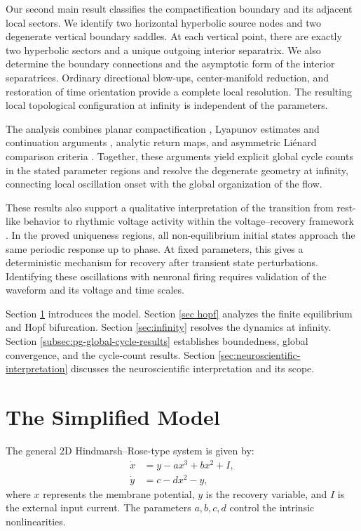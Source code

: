 \documentclass[11pt,reqno]{amsart}
\theoremstyle{plain}
\theoremstyle{definition}
\theoremstyle{remark}
\begin{document}
Our second main result classifies the compactification boundary
and its adjacent local sectors. We identify two horizontal
hyperbolic source nodes and two degenerate vertical boundary
saddles. At each vertical point, there are exactly two hyperbolic
sectors and a unique outgoing interior separatrix. We also
determine the boundary connections and the asymptotic form of
the interior separatrices. Ordinary directional blow-ups,
center-manifold reduction, and restoration of time orientation
provide a complete local resolution. The resulting local
topological configuration at infinity is independent of the
parameters.

The analysis combines planar compactification
\cite{dumortier2006qualitative}, Lyapunov estimates and continuation
arguments \cite{khalil2002nonlinear}, analytic return maps, and
asymmetric Li\'enard comparison criteria
\cite{hayashi2019criterion,zhou2023uniqueness}. Together, these
arguments yield explicit global cycle counts in the stated
parameter regions and resolve the degenerate geometry at
infinity, connecting local oscillation onset with the global
organization of the flow.

These results also support a qualitative interpretation of the
transition from rest-like behavior to rhythmic voltage activity
within the voltage--recovery framework \cite{hindmarsh1982model}.
In the proved uniqueness regions, all non-equilibrium initial
states approach the same periodic response up to phase. At fixed
parameters, this gives a deterministic mechanism for recovery
after transient state perturbations. Identifying these oscillations
with neuronal firing requires validation of the waveform and its
voltage and time scales.

Section \ref{model} introduces the model. Section \ref{sec hopf} analyzes the finite
equilibrium and Hopf bifurcation. Section \ref{sec:infinity} resolves the dynamics
at infinity. Section \ref{subsec:pg-global-cycle-results} establishes boundedness, global
convergence, and the cycle-count results. Section \ref{sec:neuroscientific-interpretation} discusses the
neuroscientific interpretation and its scope.


\section{The Simplified Model}
\label{model}
The general 2D Hindmarsh--Rose-type system is given by:
\begin{equation}
\begin{aligned}
\dot{x} &= y - ax^3 + bx^2 + I, \\
\dot{y} &= c - dx^2 - y,
\end{aligned}
\end{equation}
where \(x\) represents the membrane potential, \(y\) is the recovery variable, and \(I\) is the external input current. The parameters \(a, b, c, d\) control the intrinsic nonlinearities.
\end{document}
